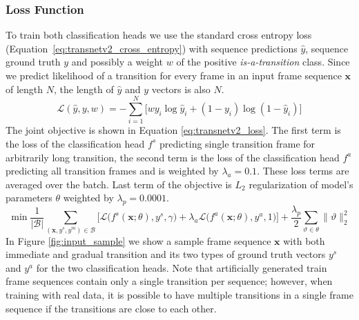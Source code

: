 \subsubsection{Loss Function}
To train both classification heads we use the standard cross entropy loss (Equation~\ref{eq:transnetv2_cross_entropy}) with sequence predictions $\hat{y}$, sequence ground truth $y$ and possibly a weight $w$ of the positive \textit{is-a-transition} class. Since we predict likelihood of a transition for every frame in an input frame sequence $\bm{x}$ of length $N$, the length of $\hat{y}$ and $y$ vectors is also $N$.
\begin{equation}
  \mathcal{L}(\hat{y}, y, w)=-\sum_{i=1}^{N} \big[ w y_i\log \hat{y}_i + (1-y_i)\log(1-\hat{y}_i) \big]
  \label{eq:transnetv2_cross_entropy}
\end{equation}
The joint objective is shown in Equation \ref{eq:transnetv2_loss}. The first term is the loss of the classification head $f^s$ predicting single transition frame for arbitrarily long transition, the second term is the loss of the classification head $f^a$ predicting all transition frames and is weighted by $\lambda_a=0.1$. These loss terms are averaged over the batch. Last term of the objective is $L_2$ regularization of model's parameters $\theta$ weighted by $\lambda_p=0.0001$.
\begin{equation}
    \min \frac{1}{|\mathcal{B}|} \sum_{\left(\bm{x},y^s,y^m\right)\in\mathcal{B}} \Big[ \mathcal{L}\big(f^s(\bm{x};\theta), y^s, \gamma\big) + \lambda_a \mathcal{L}\big(f^a(\bm{x};\theta), y^a, 1\big) \Big] + \frac{\lambda_p}{2} \sum_{\vartheta\in\theta}\|\vartheta\|^2_2 
    \label{eq:transnetv2_loss}
\end{equation}
In Figure \ref{fig:input_sample} we show a sample frame sequence $\bm{x}$ with both immediate and gradual transition and its two types of ground truth vectors $y^s$ and $y^a$ for the two classification heads. Note that artificially generated train frame sequences contain only a single transition per sequence; however, when training with real data, it is possible to have multiple transitions in a single frame sequence if the transitions are close to each other.

